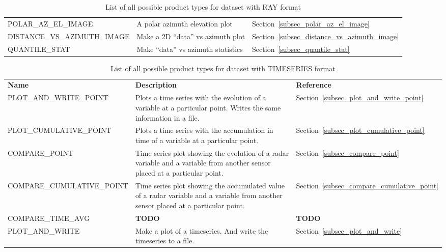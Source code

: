 \documentclass[a4paper,11pt,pdftex,twoside]{scrartcl}
\renewcommand{\bf}{\normalfont \bfseries}
\begin{document}
{{{\begin{table}[H]
\begin{tabularx}{\textwidth}{lXl}
POLAR\_AZ\_EL\_IMAGE  & A polar azimuth elevation plot             & Section~\ref{subsec_polar_az_el_image}\\
DISTANCE\_VS\_AZIMUTH\_IMAGE  & Make a 2D ``data'' vs azimuth plot & Section~\ref{subsec_distance_vs_azimuth_image}\\
QUANTILE\_STAT        & Make ``data'' vs azimuth statistics        & Section~\ref{subsec_quantile_stat}\\
\end{tabularx}
\caption{List of all possible product types for dataset with RAY format}
\label{tab_products_RAY}
\end{table}

\begin{table}[H]
\begin{tabularx}{\textwidth}{lXl}
{\bf Name} & {\bf Description} & {\bf Reference}\\

PLOT\_AND\_WRITE\_POINT    & Plots a time series with the evolution of a variable at a particular point. Writes the same information in a file. & Section~\ref{subsec_plot_and_write_point}\\
PLOT\_CUMULATIVE\_POINT    & Plots a time series with the accumulation in time of a variable at a particular point.  & Section~\ref{subsec_plot_cumulative_point}\\
COMPARE\_POINT             & Time series plot showing the evolution of a radar variable and a variable from another sensor placed at a particular point. & Section~\ref{subsec_compare_point}\\
COMPARE\_CUMULATIVE\_POINT & Time series plot showing the accumulated value of a radar variable and a variable from another sensor placed at a particular point. & Section~\ref{subsec_compare_cumulative_point}\\
COMPARE\_TIME\_AVG & {\bf TODO} & {\bf TODO} \\
PLOT\_AND\_WRITE           & Make a plot of a timeseries. And write
                             the timeseries to a file.              & Section~\ref{subsec_plot_and_write}\\
\end{tabularx}
\caption{List of all possible product types for dataset with TIMESERIES format}
\label{tab_products_TIMESERIES}
\end{table}

}}}
\end{document}
